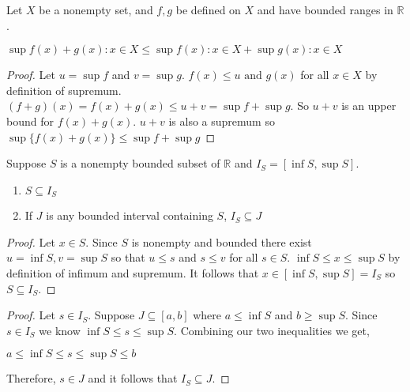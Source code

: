 \documentclass[12pt]{article}
\newcommand{\R}{\mathbb{R}}
\newenvironment{claim}[2][Claim]{\begin{trivlist}
		\item[\hskip \labelsep {\bfseries #1}\hskip \labelsep {\bfseries #2}]}{\end{trivlist}}
\begin{document}
		\newpage
	
	\begin{claim}{2.4.8}
		Let $X$ be a nonempty set, and $f,g$ be defined on $X$ and have bounded ranges in $\R$. \\
		\begin{center}
		$\sup { f(x)  + g(x) : x \in X} \leq \sup {f (x) : x \in X} + \sup {g(x) : x \in X}$
		\end{center}
	\end{claim}
	\begin{proof}
		Let $u = \sup f$ and $v = \sup g$. $f(x) \leq u \text{ and } g(x)$ for all $x \in X$ by definition of supremum. $(f + g)(x) = f(x) + g(x) \leq u + v = \sup f + \sup g$. So $u + v$ is an upper bound for $f(x) + g(x)$. $u + v$ is also a supremum so $\sup \{f(x) + g(x)\} \leq \sup f + \sup g$
	\end{proof}

	\begin{claim}{2.5.3}
		Suppose $S$ is a nonempty bounded subset of $\R$ and $I_S = [\inf S, \sup S]$.
			\begin{enumerate}[label=(\roman*)]
				\item $S \subseteq I_S$
				\item If $J$ is any bounded interval containing $S$, $I_S \subseteq J$
			\end{enumerate}	
	\end{claim}
	\begin{proof}
		Let $x \in S$. Since $S$ is nonempty and bounded there exist $u = \inf S,v = \sup S$ so that $u \leq s$ and $s \leq v$ for all $s \in S$. $\inf S \leq x \leq \sup S$ by definition of infimum and supremum. It follows that $x \in [\inf S, \sup S] = I_S$ so $S \subseteq I_S$.
	\end{proof}

	\begin{proof}
		Let $s \in I_S$. Suppose $J \subseteq [a,b]$ where $a \leq \inf S$ and $b \geq \sup S$. Since $s \in I_S$ we know $\inf S \leq s \leq \sup S$. Combining our two inequalities we get,
		\begin{center}
			$a \leq \inf S \leq s \leq \sup S \leq b$
		\end{center}
	Therefore,  $s \in J$ and it follows that $I_S \subseteq J$.
	\end{proof}
\end{document}
